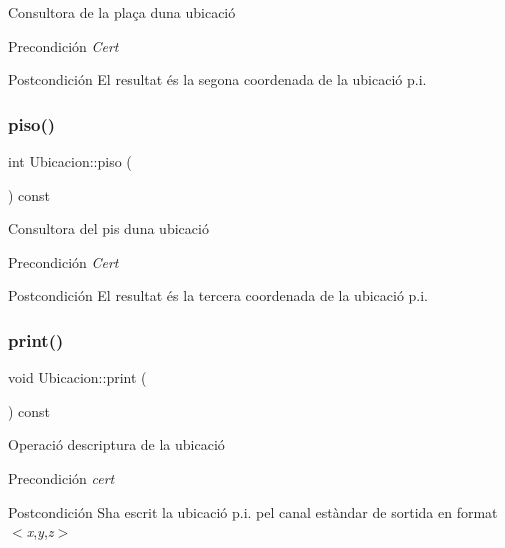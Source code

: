 Consultora de la plaça d\textquotesingle{}una ubicació 

\begin{DoxyPrecond}{Precondición}
{\itshape Cert} 
\end{DoxyPrecond}
\begin{DoxyPostcond}{Postcondición}
El resultat és la segona coordenada de la ubicació p.\+i. 
\end{DoxyPostcond}
\mbox{\label{class_ubicacion_af6099f8de4dee993e4c9119e1f879070}} 
\subsubsection{\texorpdfstring{piso()}{piso()}}
{\footnotesize\ttfamily int Ubicacion\+::piso (\begin{DoxyParamCaption}{ }\end{DoxyParamCaption}) const}



Consultora del pis d\textquotesingle{}una ubicació 

\begin{DoxyPrecond}{Precondición}
{\itshape Cert} 
\end{DoxyPrecond}
\begin{DoxyPostcond}{Postcondición}
El resultat és la tercera coordenada de la ubicació p.\+i. 
\end{DoxyPostcond}
\mbox{\label{class_ubicacion_a6b693a32d8bbd9afce30b11d19b68846}} 
\subsubsection{\texorpdfstring{print()}{print()}}
{\footnotesize\ttfamily void Ubicacion\+::print (\begin{DoxyParamCaption}{ }\end{DoxyParamCaption}) const}



Operació d\textquotesingle{}escriptura de la ubicació 

\begin{DoxyPrecond}{Precondición}
{\itshape cert} 
\end{DoxyPrecond}
\begin{DoxyPostcond}{Postcondición}
S\textquotesingle{}ha escrit la ubicació p.\+i. pel canal estàndar de sortida en format $<${\itshape x},{\itshape y},{\itshape z}$>$ 
\end{DoxyPostcond}
\mbox{\label{class_ubicacion_a4260739b394ef1981040a4925a80c469}} 
